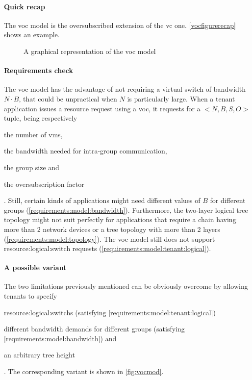 \paragraph{Quick recap}
The \gls{voc} model is the oversubscribed extension of the \gls{vc} one.
\autoref{vocfigurerecap} shows an example.

\begin{figure}[!htb]
    \centering
    \usebox{\vocfigure}
    \caption{A graphical representation of the \gls{voc} model}
    \label{vocfigurerecap}
\end{figure}

\paragraph{Requirements check}
The \gls{voc} model has the advantage of not requiring a virtual switch of bandwidth $N \cdot B$, that could be unpractical when $N$ is particularly large.
When a tenant application issues a resource request using a \gls{voc}, it requests for a $<N, B, S, O>$ tuple, being respectively
\begin{mylist}
    \item the number of \glspl{vm},
    \item the bandwidth needed for intra-group communication,
    \item the group size and
    \item the oversubscription factor
\end{mylist}.
Still, certain kinds of applications might need different values of $B$ for different groups (\xmark \ref{requirements:model:bandwidth}).
Furthermore, the two-layer logical tree topology might not suit perfectly for applications that require a chain having more than 2 network devices or a tree topology with more than 2 layers (\xmark \ref{requirements:model:topology}).
The \gls{voc} model still does not support \gls{resource:logical:switch} requests (\xmark \ref{requirements:model:tenant:logical}).

\paragraph{A possible variant}
The two limitations previously mentioned can be obviously overcome by allowing tenants to specify
\begin{mylist}
    \item \glspl{resource:logical:switch} (satisfying \cmark \ref{requirements:model:tenant:logical})
    \item different bandwidth demands for different groups (satisfying \cmark \ref{requirements:model:bandwidth}) and
    \item an arbitrary tree height
\end{mylist}.
The corresponding variant is shown in \autoref{fig:vocmod}.


